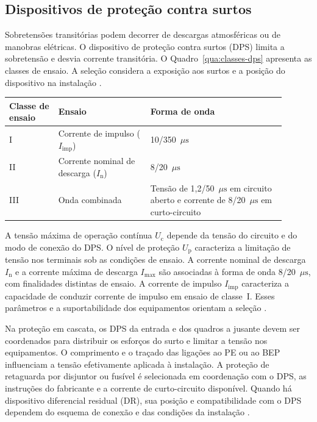\subsection{Dispositivos de proteção contra surtos}
\label{subsec:fund-dps}

Sobretensões transitórias podem decorrer de descargas atmosféricas ou de manobras elétricas. O dispositivo de proteção contra surtos (DPS) limita a sobretensão e desvia corrente transitória. O Quadro~\ref{qua:classes-dps} apresenta as classes de ensaio. A seleção considera a exposição aos surtos e a posição do dispositivo na instalação \cite[itens~5.4.2 e~6.3.5.2.4]{abnt5410}\cite[seção~7.25.4]{enel1580}.

\begin{quadro}[!htbp]
\centering
\caption{Classes de ensaio dos dispositivos de proteção contra surtos}
\label{qua:classes-dps}
{\small\renewcommand{\arraystretch}{1.2}
\begin{tabular}{|p{0.16\linewidth}|p{0.30\linewidth}|p{0.44\linewidth}|}\hline
\textbf{Classe de ensaio} & \textbf{Ensaio} & \textbf{Forma de onda} \\\hline
I & Corrente de impulso (\(I_{\mathrm{imp}}\)) & 10/350~\(\mu\mathrm{s}\) \\\hline
II & Corrente nominal de descarga (\(I_{\mathrm{n}}\)) & 8/20~\(\mu\mathrm{s}\) \\\hline
III & Onda combinada & Tensão de 1,2/50~\(\mu\mathrm{s}\) em circuito aberto e corrente de 8/20~\(\mu\mathrm{s}\) em curto-circuito \\\hline
\end{tabular}}
\end{quadro}

A tensão máxima de operação contínua \(U_{\mathrm{c}}\) depende da tensão do circuito e do modo de conexão do DPS. O nível de proteção \(U_{\mathrm{p}}\) caracteriza a limitação de tensão nos terminais sob as condições de ensaio. A corrente nominal de descarga \(I_{\mathrm{n}}\) e a corrente máxima de descarga \(I_{\mathrm{max}}\) são associadas à forma de onda 8/20~\(\mu\mathrm{s}\), com finalidades distintas de ensaio. A corrente de impulso \(I_{\mathrm{imp}}\) caracteriza a capacidade de conduzir corrente de impulso em ensaio de classe~I. Esses parâmetros e a suportabilidade dos equipamentos orientam a seleção \cite[item~6.3.5.2.4]{abnt5410}\cite[capítulo~3]{schneiderdps}.

Na proteção em cascata, os DPS da entrada e dos quadros a jusante devem ser coordenados para distribuir os esforços do surto e limitar a tensão nos equipamentos. O comprimento e o traçado das ligações ao PE ou ao BEP influenciam a tensão efetivamente aplicada à instalação. A proteção de retaguarda por disjuntor ou fusível é selecionada em coordenação com o DPS, as instruções do fabricante e a corrente de curto-circuito disponível. Quando há dispositivo diferencial residual (DR), sua posição e compatibilidade com o DPS dependem do esquema de conexão e das condições da instalação \cite[itens~6.3.5.2.4--6.3.5.2.6 e~6.3.5.2.9]{abnt5410}\cite[seção~7.25.4]{enel1580}.

